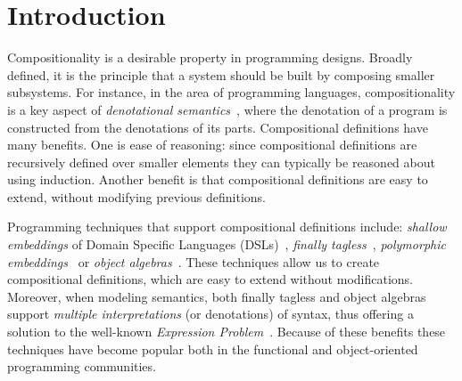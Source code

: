
\section{Introduction}
\label{sec:introduction}

Compositionality is a desirable property in programming
designs. Broadly defined, it is the principle that a
system should be built by composing smaller subsystems. For instance,
in the area of programming languages, compositionality is
a key aspect of \emph{denotational semantics}~\cite{scott1971toward, scott1970outline}, where
the denotation of a program is constructed from the denotations of its parts.
% 
% 
Compositional definitions have many benefits.
One is ease of reasoning: since compositional
definitions are recursively defined over smaller elements they
can typically be reasoned about using induction. Another benefit
is that compositional definitions are easy to extend,
without modifying previous definitions.
% 

Programming techniques that support compositional
definitions include:
\emph{shallow embeddings} of
Domain Specific Languages (DSLs)~\cite{DBLP:conf/icfp/GibbonsW14}, \emph{finally
  tagless}~\cite{CARETTE_2009}, \emph{polymorphic embeddings}~\cite{hofer_polymorphic_2008} or
\emph{object algebras}~\cite{oliveira2012extensibility}. These techniques allow us to create
compositional definitions, which are easy to extend without
modifications. Moreover, when modeling semantics, both finally tagless and object algebras
support \emph{multiple interpretations} (or denotations) of
syntax, thus offering a solution to the well-known \emph{Expression Problem}~\cite{wadler1998expression}.
Because of these benefits these techniques have become
popular both in the functional and object-oriented
programming communities.

